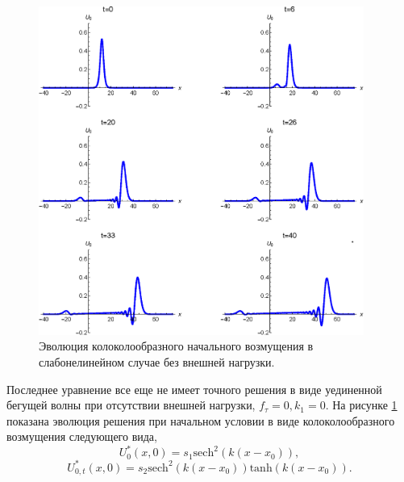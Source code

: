 \begin{figure}
	\begin{center}
		\includegraphics[width=0.95\textwidth]{images/boundary_fig2.eps}
		\caption{Эволюция колоколообразного начального возмущения в слабонелинейном случае без внешней нагрузки.}
		\label{bound_figure2}
	\end{center}
\end{figure} 
Последнее уравнение все еще не имеет точного решения в виде уединенной бегущей волны при отсутствии внешней нагрузки, $f_\tau = 0, k_1 = 0$. На рисунке \ref{bound_figure2} показана эволюция решения при начальном условии в виде колоколообразного возмущения следующего вида,
$$
	U_0^*(x,0)=s_1 {\text{sech}}^2 (k (x-x_0)),
$$
$$	
	U_{0,t}^*(x,0)= s_2 {\text{sech}}^2 (k (x-x_0)) {\text{tanh}} (k (x-x_0)). %
$$
